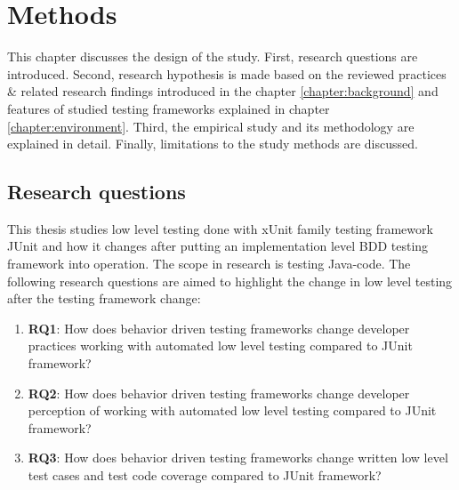 \chapter{Methods}
\label{chapter:methods}
This chapter discusses the design of the study. First, research questions are introduced.
Second, research hypothesis is made based on the reviewed practices \& related research findings introduced in the chapter \ref{chapter:background}
and features of studied testing frameworks explained in chapter \ref{chapter:environment}.
Third, the empirical study and its methodology are explained in detail. Finally, limitations to the study methods are discussed.

\section{Research questions}
This thesis studies low level testing done with xUnit family testing framework JUnit and how it changes after putting
an implementation level BDD testing framework into operation. The scope in research is testing Java-code. The following
research questions are aimed to highlight the change in low level testing after the testing framework change:
\begin{enumerate}
\item \textbf{RQ1}: How does behavior driven testing frameworks change developer practices working with automated low level testing compared to JUnit framework?
\item \textbf{RQ2}: How does behavior driven testing frameworks change developer perception of working with automated low level testing compared to JUnit framework?
\item \textbf{RQ3}: How does behavior driven testing frameworks change written low level test cases and test code coverage compared to JUnit framework?
\end{enumerate}

